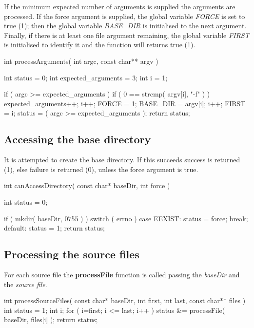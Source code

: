 \documentclass[]{article}
\begin{document}
If the minimum expected number of arguments is supplied the arguments are processed.
If the force argument is supplied, the global variable \emph{FORCE} is set to true (1);
then the global variable \emph{BASE_DIR} is initialised to the next argument.
Finally, if there is at least one file argument remaining, the global variable \emph{FIRST} is initialised to identify it and the function will returns true (1).

\begin{verbatimtab}
int processArguments( int argc, const char** argv )
{
	int status             = 0;
	int expected_arguments = 3;
	int i                  = 1;

	if ( argc >= expected_arguments )
	{
		if ( 0 == strcmp( argv[i], "-f" ) )
		{
			expected_arguments++;
			i++;
			FORCE = 1;
		}
		BASE_DIR = argv[i]; i++;
		FIRST    = i;
		status   = ( argc >= expected_arguments );
	}
	return status;	
}

\end{verbatimtab}
\subsection{		Accessing the base directory}

It is attempted to create the base directory.
If this succeeds success is returned (1), else failure is returned (0), unless the force argument is true.

\begin{verbatimtab}
int canAccessDirectory( const char* baseDir, int force )
{
	int status = 0;

	if ( mkdir( baseDir, 0755 ) )
	{
		switch ( errno )
		{
		case EEXIST:
			status = force;
			break;
		default:
			status = 1;
		}
	}
	return status;
}

\end{verbatimtab}
\subsection{		Processing the source files}

For each source file the \textbf{processFile} function is called passing the \emph{baseDir} and the \emph{source file}.

\begin{verbatimtab}

int processSourceFiles( const char* baseDir, int first, int last, const char** files )
{
	int status = 1;
	int i;
	for ( i=first; i <= last; i++ )
	{
		status &= processFile( baseDir, files[i] );
	}
	return status;
}

\end{verbatimtab}
\end{document}
